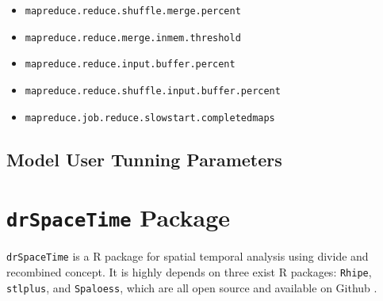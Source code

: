 \begin{itemize}
\item \texttt{mapreduce.reduce.shuffle.merge.percent}

\item \texttt{mapreduce.reduce.merge.inmem.threshold}

\item \texttt{mapreduce.reduce.input.buffer.percent}

\item \texttt{mapreduce.reduce.shuffle.input.buffer.percent}

\item \texttt{mapreduce.job.reduce.slowstart.completedmaps}

\end{itemize}


\subsection{Model User Tunning Parameters}


\section{\texttt{drSpaceTime} Package}

\texttt{drSpaceTime} is a R package for spatial temporal analysis using divide 
and recombined concept. It is highly depends on three exist R packages: 
\texttt{Rhipe}, \texttt{stlplus}, and \texttt{Spaloess}, which are all open 
source and available on Github \cite{github}.